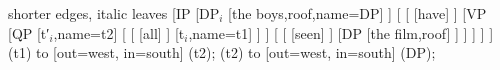 \begin{exe}
\ex \label{ex:qfgg}
	\begin{forest} shorter edges, italic leaves
	[IP
		[DP$_i$
			[{the boys},roof,name=DP]
		]
		[
			[
				[have]
			]
			[VP
				[QP
					[t′$_i$,name=t2]
					[
						[
							[all]
						]
						[t$_i$,name=t1]
					]
				]
				[
					[
						[seen]
					]
					[DP
						[{the film},roof]
					]
				]
			]
		]
	]
	 (t1) to [out=west, in=south] (t2);
	 (t2) to [out=west, in=south] (DP);
	\end{forest}
\end{exe}





